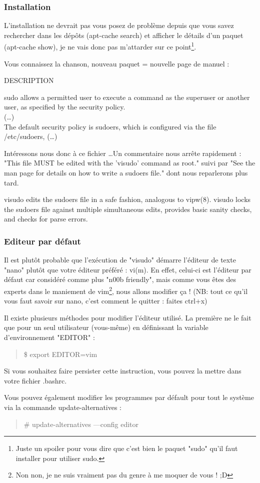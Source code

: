 \documentclass[a4paper,11pt]{article}
\newcommand{\commande}[1] {
    \begin{quote}
    \tt\raggedright #1 
    \end{quote}
}
\newcommand{\man}[2]{
    \begin{tcolorbox}[toprule=3mm,width=\textwidth,outer arc=0mm,colbacktitle=grayman,coltitle=black,colback={grayman},colframe={grayman},title={man : \tt #1}]
        \tt\raggedright #2
    \end{tcolorbox}
}
\newcommand{\mandesc}[1]{
    \begin{adjustwidth}{0.8cm}{}
        #1
    \end{adjustwidth}
}
\begin{document}
\subsubsection{Installation}
\par L'installation ne devrait pas vous posez de problème depuis que vous savez rechercher dans les dépôts (apt-cache search) et afficher le détails d'un paquet (apt-cache show), je ne vais donc pas m'attarder sur ce point\footnote{Juste un spoiler pour vous dire que c'est bien le paquet "sudo" qu'il faut installer pour utiliser sudo.}.
\par Vous connaissez la chanson, nouveau paquet = nouvelle page de manuel :
\man{sudo}{DESCRIPTION
\mandesc{sudo allows a permitted user to execute a command as the superuser or another user, as specified by the security policy.\\
(\dots)\\
The default security policy is sudoers, which is configured via the file /etc/sudoers, (\dots)}}
\par Intéressons nous donc à ce fichier \ldots  Un commentaire nous arrête rapidement : "This file MUST be edited with the 'visudo' command as root." suivi par "See the man page for details on how to write a sudoers file." dont nous reparlerons plus tard.
\man{visudo}{visudo edits the sudoers file in a safe fashion, analogous to vipw(8). visudo locks the sudoers file against multiple simultaneous edits, provides basic sanity checks, and checks for parse errors.}

\subsubsection{Editeur par défaut}
\par Il est plutôt probable que l'exécution de "visudo" démarre l'éditeur de texte "nano" plutôt que votre éditeur préféré : vi(m). En effet, celui-ci est l'éditeur par défaut car considéré comme plus "n00b friendly", mais comme vous êtes des experts dans le maniement de vim\footnote{Non non, je ne suis vraiment pas du genre à me moquer de vous ! ;D}, nous allons modifier ça ! (NB: tout ce qu'il vous faut savoir sur nano, c'est comment le quitter : faites ctrl+x)
\par Il existe plusieurs méthodes pour modifier l'éditeur utilisé. La première ne le fait que pour un seul utilisateur (vous-même) en définissant la variable d'environnement "EDITOR" :
\commande{\$ export EDITOR=vim}
\par Si vous souhaitez faire persister cette instruction, vous pouvez la mettre dans votre fichier .bashrc.
\par Vous pouvez également modifier les programmes par défault pour tout le système via la commande update-alternatives :
\commande{\# update-alternatives ---config editor}
\end{document}
